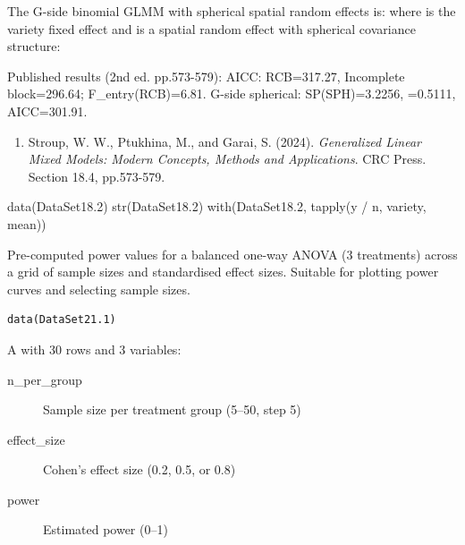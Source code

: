 \documentclass[a4paper]{book}
\begin{document}
%
\begin{Details}
The G-side binomial GLMM with spherical spatial random effects is:
where  is the variety fixed effect and  is a
spatial random effect with spherical covariance structure:

Published results (2nd ed. pp.573-579):
AICC: RCB=317.27, Incomplete block=296.64; F\_entry(RCB)=6.81.
G-side spherical: SP(SPH)=3.2256, =0.5111, AICC=301.91.
\end{Details}
%
\begin{References}
\begin{enumerate}

\item{} Stroup, W. W., Ptukhina, M., and Garai, S. (2024).
\emph{Generalized Linear Mixed Models: Modern Concepts,
Methods and Applications}. CRC Press. Section 18.4, pp.573-579.

\end{enumerate}

\end{References}
%
\begin{SeeAlso}
\end{SeeAlso}
%
\begin{Examples}
\begin{ExampleCode}
data(DataSet18.2)
str(DataSet18.2)
with(DataSet18.2, tapply(y / n, variety, mean))
\end{ExampleCode}
\end{Examples}
%
\begin{Description}
Pre-computed power values for a balanced one-way ANOVA (3 treatments)
across a grid of sample sizes and standardised effect sizes.
Suitable for plotting power curves and selecting sample sizes.
\end{Description}
%
\begin{Usage}
\begin{verbatim}
data(DataSet21.1)
\end{verbatim}
\end{Usage}
%
\begin{Format}
A  with 30 rows and 3 variables:
\begin{description}

\item[n\_per\_group] Sample size per treatment group (5–50, step 5)
\item[effect\_size] Cohen's  effect size (0.2, 0.5, or 0.8)
\item[power] Estimated power (0–1)

\end{description}

\end{Format}
\end{document}
